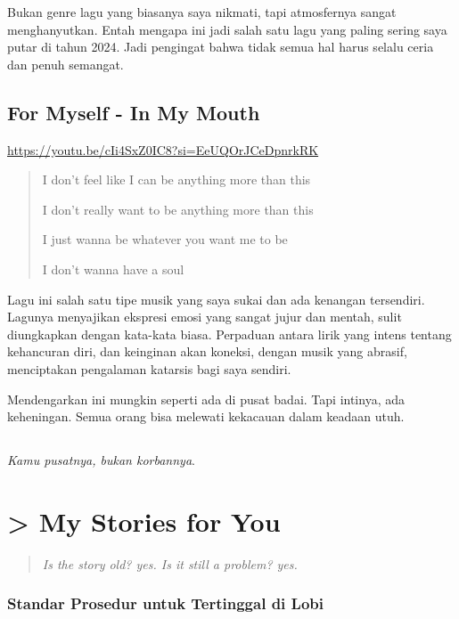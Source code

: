 \documentclass[
  letterpaper,
  DIV=11,
  numbers=noendperiod]{scrreprt}
\begin{document}
Bukan genre lagu yang biasanya saya nikmati, tapi atmosfernya sangat
menghanyutkan. Entah mengapa ini jadi salah satu lagu yang paling sering
saya putar di tahun 2024. Jadi pengingat bahwa tidak semua hal harus
selalu ceria dan penuh semangat.

\section{For Myself - In My Mouth}\label{for-myself---in-my-mouth}

\url{https://youtu.be/cIi4SxZ0IC8?si=EeUQOrJCeDpnrkRK}

\begin{quote}
I don't feel like I can be anything more than this

I don't really want to be anything more than this

I just wanna be whatever you want me to be

I don't wanna have a soul
\end{quote}

Lagu ini salah satu tipe musik yang saya sukai dan ada kenangan
tersendiri. Lagunya menyajikan ekspresi emosi yang sangat jujur dan
mentah, sulit diungkapkan dengan kata-kata biasa. Perpaduan antara lirik
yang intens tentang kehancuran diri, dan keinginan akan koneksi, dengan
musik yang abrasif, menciptakan pengalaman katarsis bagi saya sendiri.

Mendengarkan ini mungkin seperti ada di pusat badai. Tapi intinya, ada
keheningan. Semua orang bisa melewati kekacauan dalam keadaan utuh.

\section{}\label{section}

\emph{Kamu pusatnya, bukan korbannya}.


\chapter{\textgreater{} My Stories for You}\label{my-stories-for-you}

\begin{quote}
\emph{Is the story old? yes. Is it still a problem? yes.}
\end{quote}

\subsection{\texorpdfstring{\textbf{Standar Prosedur untuk Tertinggal di
Lobi}}{Standar Prosedur untuk Tertinggal di Lobi}}\label{standar-prosedur-untuk-tertinggal-di-lobi}
\end{document}
